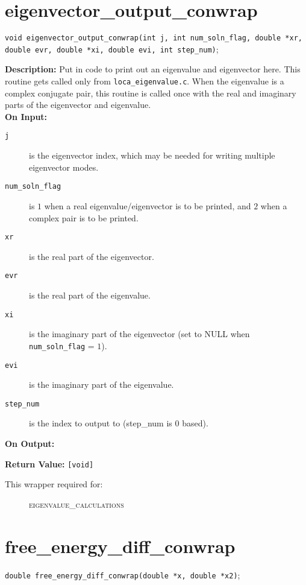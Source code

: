 \section{eigenvector\_output\_conwrap}
\texttt{void eigenvector\_output\_conwrap(int j, int num\_soln\_flag, double *xr, double evr, double *xi, double evi, int step\_num)};

{\bf Description:} Put in code to print out an eigenvalue and eigenvector here. This routine gets called only from \texttt{loca\_eigenvalue.c}. When the eigenvalue is a complex conjugate pair, this routine is called once with the real and imaginary parts of
the eigenvector and eigenvalue.\\

{\bf On Input:}
\begin{description}
\item[\texttt{j}] is the eigenvector index, which may be needed for writing multiple eigenvector modes.
\item[\texttt{num\_soln\_flag}] is $1$ when a real eigenvalue/eigenvector is to be printed, and $2$ when a complex pair is to be printed.
\item[\texttt{xr}]  is the real part of the eigenvector.
\item[\texttt{evr}] is the real part of the eigenvalue.
\item[\texttt{xi}]  is the imaginary part of the eigenvector (set to NULL when \texttt{num\_soln\_flag} = $1$).
\item[\texttt{evi}] is the imaginary part of the eigenvalue.
\item[\texttt{step\_num}] is the index to output to (step\_num is 0 based).
\end{description}

{\bf On Output:}

{\bf Return Value:} \texttt{[void]} 

\begin{description}
\item[This wrapper required for:]
\textsc{eigenvalue\_calculations}
\end{description}

\section{free\_energy\_diff\_conwrap}
\texttt{double free\_energy\_diff\_conwrap(double *x, double *x2)}; \\

